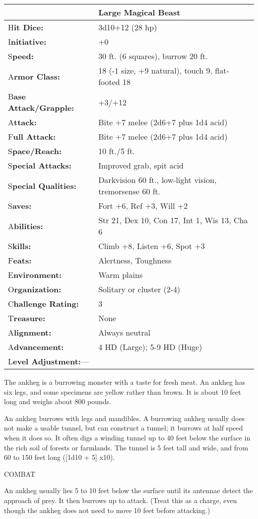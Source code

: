 \documentclass{article}
\begin{document}
\begin{tabular}{|>{\raggedright}p{91pt}|>{\raggedright}p{212pt}|}
\hline
 & Large Magical Beast\tabularnewline
\hline
H\textbf{it Dice:} & 3d10+12 (28 hp)\tabularnewline
\hline
I\textbf{nitiative:} & +0\tabularnewline
\hline
S\textbf{peed:} & 30 ft. (6 squares), burrow 20 ft.\tabularnewline
\hline
A\textbf{rmor Class:} & 18 (-1 size, +9 natural), touch 9, flat-footed 18\tabularnewline
\hline
B\textbf{ase Attack/Grapple:} & +3/+12\tabularnewline
\hline
A\textbf{ttack:} & Bite +7 melee (2d6+7 plus 1d4 acid)\tabularnewline
\hline
F\textbf{ull Attack:} & Bite +7 melee (2d6+7 plus 1d4 acid)\tabularnewline
\hline
S\textbf{pace/Reach:} & 10 ft./5 ft.\tabularnewline
\hline
S\textbf{pecial Attacks:} & Improved grab, spit acid\tabularnewline
\hline
S\textbf{pecial Qualities:} & Darkvision 60 ft., low-light vision, tremorsense 
60 ft.\tabularnewline
\hline
S\textbf{aves:} & Fort +6, Ref +3, Will +2\tabularnewline
\hline
A\textbf{bilities:} & Str 21, Dex 10, Con 17, Int 1, Wis 13, Cha 6\tabularnewline
\hline
S\textbf{kills:} & Climb +8, Listen +6, Spot +3\tabularnewline
\hline
F\textbf{eats:} & Alertness, Toughness\tabularnewline
\hline
E\textbf{nvironment:} & Warm plains\tabularnewline
\hline
O\textbf{rganization:} & Solitary or cluster (2-4)\tabularnewline
\hline
C\textbf{hallenge Rating:} & 3\tabularnewline
\hline
T\textbf{reasure:} & None\tabularnewline
\hline
A\textbf{lignment:} & Always neutral\tabularnewline
\hline
A\textbf{dvancement:} & 4 HD (Large); 5-9 HD (Huge)\tabularnewline
\hline
L\textbf{evel Adjustment:}--- & \tabularnewline
\hline
\end{tabular}

The ankheg is a burrowing monster with a taste for fresh meat. An ankheg has six 
legs, and some specimens are yellow rather than brown. It is about 10 feet long 
and weighs about 800 pounds.

An ankheg burrows with legs and mandibles. A burrowing ankheg usually does not 
make a usable tunnel, but can construct a tunnel; it burrows at half speed when 
it does so. It often digs a winding tunnel up to 40 feet below the surface in the 
rich soil of forests or farmlands. The tunnel is 5 feet tall and wide, and from 
60 to 150 feet long ([1d10 + 5] x$ $10). 

COMBAT

An ankheg usually lies 5 to 10 feet below the surface until its antennae detect 
the approach of prey. It then burrows up to attack. (Treat this as a charge, even 
though the ankheg does not need to move 10 feet before attacking.)
\end{document}
